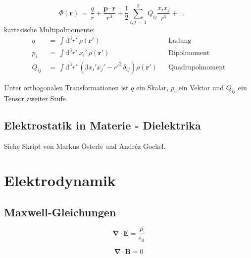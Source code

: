 \documentclass[titlepage,11pt,a4paper,ngerman]{report}
\newcommand{\prt}[2]{\frac{\partial #1}{\partial #2}}
\newcommand{\dd}{\mathrm{d}}
\renewcommand{\vec}[1]{\bm{#1}}
\renewcommand{\epsilon}{\varepsilon}
\newcommand{\vabla}{\vec{\nabla}}
\renewcommand{\paragraph}[1]{\subsubsection{#1}}
\newcommand{\eq}{\,=\,}
\begin{document}
\[\Phi(\vec{r})\eq \frac{q}{r}+\frac{\vec{p}\cdot\vec{r}}{r^3}+\frac{1}{2}\sum_{i,j\eq 1}^{3}Q_{ij}\frac{x_ix_j}{r^5}+\dots\qquad\tag{$r>R_0$}\]
\noindent
kartesische Multipolmomente:
\begin{align*}
q&\eq \int\dd^3r'\ \rho(\vec{r}')&&\text{Ladung}\\
p_i&\eq \int\dd^3r'\ x_i'\,\rho(\vec{r}')&&\text{Dipolmoment}\\
Q_{ij}&\eq \int\dd^3 r'\ (3x_i'x_j'-r'^2\, \delta_{ij})\rho(\vec{r}')&&\text{Quadrupolmoment}
\end{align*}

Unter orthogonalen Transformationen ist $q$ ein Skalar, $p_i$ ein Vektor und $Q_{ij}$ ein Tensor zweiter Stufe.





\newpage
\section{Elektrostatik in Materie - Dielektrika}
Siehe Skript von Markus Österle und Andréz Gockel.


\chapter{Elektrodynamik}

\section{Maxwell-Gleichungen}
\begin{equation}
\vabla\cdot\vec{E}=\frac{\rho}{\epsilon_0}\label{Max:1}
\end{equation}

\begin{equation}
\vabla\cdot\vec{B}=0\label{Max:2}
\end{equation}
\end{document}
